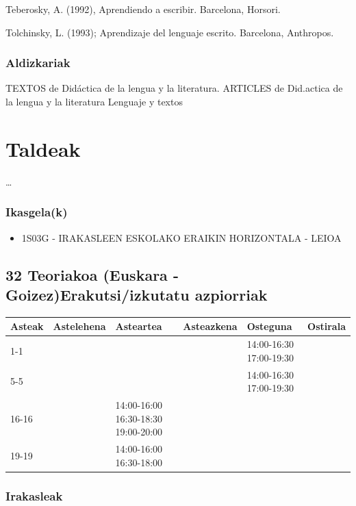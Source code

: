 \documentclass[
]{book}
\providecommand{\tightlist}{%
  \setlength{\itemsep}{0pt}\setlength{\parskip}{0pt}}
\begin{document}
Teberosky, A. (1992), Aprendiendo a escribir. Barcelona, Horsori.

Tolchinsky, L. (1993); Aprendizaje del lenguaje escrito. Barcelona, Anthropos.

\hypertarget{aldizkariak}{%
\subsubsection*{Aldizkariak}\label{aldizkariak}}

TEXTOS de Didáctica de la lengua y la literatura.
ARTICLES de Did.actica de la lengua y la literatura
Lenguaje y textos

\hypertarget{taldeak}{%
\section*{Taldeak}\label{taldeak}}

\ldots{}

\hypertarget{ikasgelak}{%
\subsubsection*{Ikasgela(k)}\label{ikasgelak}}

\begin{itemize}
\tightlist
\item
  1S03G - IRAKASLEEN ESKOLAKO ERAIKIN HORIZONTALA - LEIOA
\end{itemize}

\hypertarget{teoriakoa-euskara---goizezerakutsiizkutatu-azpiorriak}{%
\subsection{32 Teoriakoa (Euskara - Goizez)Erakutsi/izkutatu azpiorriak}\label{teoriakoa-euskara---goizezerakutsiizkutatu-azpiorriak}}

\begin{longtable}[]{@{}llllll@{}}
\toprule
Asteak & Astelehena & Asteartea & Asteazkena & Osteguna & Ostirala\tabularnewline
\midrule
\endhead
1-1 & & & & 14:00-16:30 17:00-19:30 &\tabularnewline
5-5 & & & & 14:00-16:30 17:00-19:30 &\tabularnewline
16-16 & & 14:00-16:00 16:30-18:30 19:00-20:00 & & &\tabularnewline
19-19 & & 14:00-16:00 16:30-18:00 & & &\tabularnewline
\bottomrule
\end{longtable}

\hypertarget{irakasleak}{%
\subsubsection*{Irakasleak}\label{irakasleak}}
\end{document}
